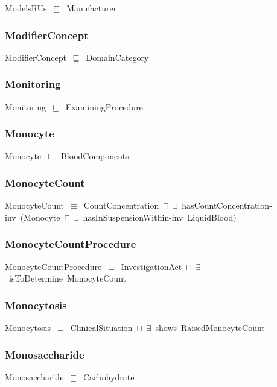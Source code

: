 \documentclass{article}
\begin{document}
ModelsRUs~\ensuremath{\sqsubseteq}~Manufacturer~

\subsubsection*{ModifierConcept}

ModifierConcept~\ensuremath{\sqsubseteq}~DomainCategory~

\subsubsection*{Monitoring}

Monitoring~\ensuremath{\sqsubseteq}~ExaminingProcedure~

\subsubsection*{Monocyte}

Monocyte~\ensuremath{\sqsubseteq}~BloodComponents~

\subsubsection*{MonocyteCount}

MonocyteCount~\ensuremath{\equiv}~CountConcentration~\ensuremath{\sqcap}~\ensuremath{\exists}~hasCountConcentration-inv~(Monocyte~\ensuremath{\sqcap}~\ensuremath{\exists}~hasInSuspensionWithin-inv~LiquidBlood)

\subsubsection*{MonocyteCountProcedure}

MonocyteCountProcedure~\ensuremath{\equiv}~InvestigationAct~\ensuremath{\sqcap}~\ensuremath{\exists}~isToDetermine~MonocyteCount

\subsubsection*{Monocytosis}

Monocytosis~\ensuremath{\equiv}~ClinicalSituation~\ensuremath{\sqcap}~\ensuremath{\exists}~shows~RaisedMonocyteCount

\subsubsection*{Monosaccharide}

Monosaccharide~\ensuremath{\sqsubseteq}~Carbohydrate~
\end{document}
